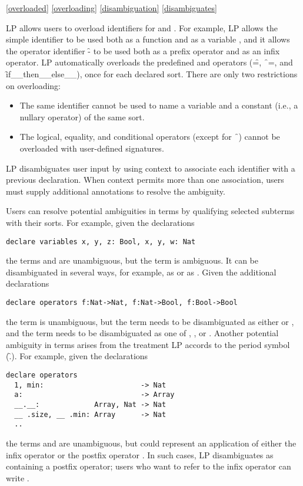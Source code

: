 \ref{overloaded}
\ref{overloading}
\ref{disambiguation}
\ref{disambiguates}

LP allows users to overload identifiers for  and
.  For example, LP allows the simple identifier 
 to be used both as a function  and as a variable 
, and it allows the operator identifier \f{-} to be used both as a 
prefix operator and as an infix operator.  LP automatically overloads the
predefined  and 
operators (\f{=}, \f{~=}, and \f{if__then__else__}), once for each declared
sort.  There are only two restrictions on overloading:
\begin{itemize}
\item
The same identifier cannot be used to name a variable and a constant (i.e., a
nullary operator) of the same sort.
\item
The logical, equality, and conditional operators (except for \f{~}) cannot be
overloaded with user-defined signatures.
\end{itemize}

LP disambiguates user input by using context to associate each identifier with
a previous declaration.  When context permits more than one association, users
must supply additional annotations to resolve the ambiguity.



Users can resolve potential ambiguities in terms by qualifying selected
subterms with their sorts.  For example, given the declarations
\begin{verbatim}
declare variables x, y, z: Bool, x, y, w: Nat
\end{verbatim}
the terms  and  are unambiguous, but the term  is
ambiguous.  It can be disambiguated in several ways, for example, as 
 or as .  Given the additional declarations
\begin{verbatim}
declare operators f:Nat->Nat, f:Nat->Bool, f:Bool->Bool
\end{verbatim}
the term  is unambiguous, but the term  needs to be
disambiguated as either  or , and the term 
needs to be disambiguated as one of , , or
.
\p
Another potential ambiguity in terms arises from the treatment LP accords to
the period symbol (\f{.}).  For example, given the declarations
\begin{verbatim}
declare operators
  1, min:                       -> Nat
  a:                            -> Array
  __.__:             Array, Nat -> Nat
  __ .size, __ .min: Array      -> Nat
  ..
\end{verbatim}
the terms  and  are unambiguous, but  could
represent an application of either the infix operator  or the postfix
operator .  In such cases, LP disambiguates  as containing a
postfix operator; users who want  to refer to the infix operator can
write .

